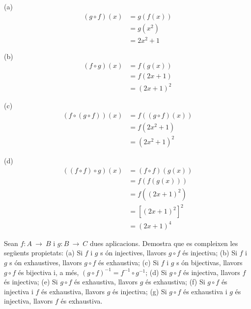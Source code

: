 \begin{solucio}
(a)
\begin{align*}
(g\circ f)(x)& =g\left( f(x)\right) \\
& =g(x^{2}) \\
& =2x^{2}+1
\end{align*}

(b)%
\begin{align*}
(f\circ g)(x)& =f\left( g(x)\right) \\
& =f(2x+1) \\
& =(2x+1)^{2}
\end{align*}

(c)%
\begin{align*}
\left( f\circ (g\circ f)\right) (x)& =f\left( (g\circ f)(x)\right) \\
& =f\left( 2x^{2}+1\right) \\
& =(2x^{2}+1)^{2}
\end{align*}

(d)%
\begin{align*}
\left( (f\circ f)\circ g\right) (x)& =(f\circ f)\left( g(x)\right) \\
& =f\left( f\left( g(x)\right) \right) \\
& =f\left( (2x+1)^{2}\right) \\
& =\left[ (2x+1)^{2}\right] ^{2} \\
& =(2x+1)^{4}
\end{align*}
\end{solucio}

\begin{exercici}
Sean $f:A~\longrightarrow ~B$ i $g:B~\longrightarrow ~C$ dues aplicacions.
Demostra que es compleixen les seg\"{u}ents propietats: (a) Si $f$ i $g$ s%
\'{o}n injectives, llavors $g\circ f$ \'{e}s injectiva; (b) Si $f$ i $g$ s%
\'{o}n exhaustives, llavors $g\circ f$ \'{e}s exhaustiva; (c) Si $f$ i $g$ s%
\'{o}n bijectivas, llavors $g\circ f$ \'{e}s bijectiva i, a m\'{e}s, $%
(g\circ f)^{-1}=f^{-1}\circ g^{-1}$; (d) Si $g\circ f$ \'{e}s injectiva,
llavors $f$ \'{e}s injectiva; (e) Si $g\circ f$ \'{e}s exhaustiva, llavors $%
g $ \'{e}s exhaustiva; (f) Si $g\circ f$ \'{e}s injectiva i $f$ \'{e}s
exhaustiva, llavors $g$ \'{e}s injectiva; (g) Si $g\circ f$ \'{e}s
exhaustiva i $g$ \'{e}s injectiva, llavors $f$ \'{e}s exhaustiva.
\end{exercici}

